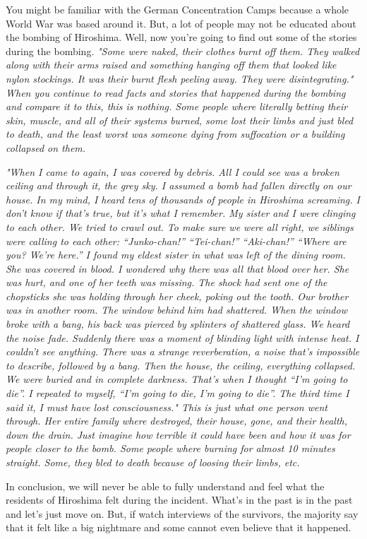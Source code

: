 You might be familiar with the German Concentration Camps because a whole World
War was based around it. But, a lot of people may not be educated about the
bombing of Hiroshima. Well, now you’re going to find out some of the stories
during the bombing. \it{"Some were naked, their clothes burnt off them. They
walked along with their arms raised and something hanging off them that looked
like nylon stockings. It was their burnt flesh peeling away. They were
disintegrating."} When you continue to read facts and stories that happened
during the bombing and compare it to this, this is nothing. Some people where
literally betting their skin, muscle, and all of their systems burned, some lost
their limbs and just bled to death, and the least worst was someone dying from
suffocation or a building collapsed on them.

\it{"When I came to again, I was covered by debris. All I could see was a broken
ceiling and through it, the grey sky. I assumed a bomb had fallen directly on
our house. In my mind, I heard tens of thousands of people in Hiroshima
screaming. I don’t know if that’s true, but it’s what I remember. My sister and
I were clinging to each other. We tried to crawl out. To make sure we were all
right, we siblings were calling to each other: “Junko-chan!” “Tei-chan!”
“Aki-chan!” “Where are you? We’re here.” I found my eldest sister in what was
left of the dining room. She was covered in blood. I wondered why there was all
that blood over her. She was hurt, and one of her teeth was missing. The shock
had sent one of the chopsticks she was holding through her cheek, poking out the
tooth. Our brother was in another room. The window behind him had shattered.
When the window broke with a bang, his back was pierced by splinters of
shattered glass. We heard the noise fade. Suddenly there was a moment of
blinding light with intense heat. I couldn’t see anything. There was a strange
reverberation, a noise that’s impossible to describe, followed by a bang. Then
the house, the ceiling, everything collapsed. We were buried and in complete
darkness. That’s when I thought “I’m going to die”. I repeated to myself, “I’m
going to die, I’m going to die”. The third time I said it, I must have lost
consciousness." This is just what one person went through. Her entire family
where destroyed, their house, gone, and their health, down the drain. Just
imagine how terrible it could have been and how it was for people closer to the
bomb. Some people where burning for almost 10 minutes straight. Some, they bled
to death because of loosing their limbs, etc.}

In conclusion, we will never be able to fully understand and feel what the
residents of Hiroshima felt during the incident. What’s in the past is in the
past and let’s just move on. But, if watch interviews of the survivors, the
majority say that it felt like a big nightmare and some cannot even believe that
it happened.

